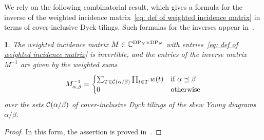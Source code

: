 \documentclass[oneside,english]{amsart}
\numberwithin{equation}{section}
\numberwithin{figure}{section}
\theoremstyle{plain}
\theoremstyle{plain}
\theoremstyle{plain}
\theoremstyle{remark}
\theoremstyle{plain}
\newtheorem{prop}[lem]{\protect\propositionname}
\theoremstyle{plain}
\theoremstyle{plain}
\theoremstyle{plain}
\theoremstyle{plain}
\theoremstyle{plain}
\theoremstyle{plain}
\theoremstyle{plain}
\providecommand{\propositionname}{Proposition}
\begin{document}
We rely on the following combinatorial result, which
gives a formula for the inverse of the weighted incidence 
matrix~\eqref{eq: def of weighted incidence matrix} in terms of cover-inclusive Dyck tilings.
Such formulas for the inverses appear
in~\cite{KW-double_dimer_pairings_and_skew_Young_diagrams,
SZ-path_representations_of_maximal_paraboloc_KL_polynomials, KKP-boundary_correlations_in_planar_LERW_and_UST}.
\begin{prop}
\label{prop: weighted KW incidence matrix inversion}
The weighted incidence matrix $M \in \mathbb{C}^{\mathrm{DP}_N \times \mathrm{DP}_N}$ with entries~\eqref{eq: def of weighted incidence matrix}
is invertible, and the entries of the inverse matrix $M^{-1}$ are given by the weighted sums %
\begin{align*} %
M^{-1}_{\alpha, \beta} = \begin{cases}
\sum_{T \in \CItilingsof (\alpha/\beta)} \prod_{t \in T} w(t) & \text{if }\alpha \DPleq \beta \\
0 & \text{otherwise} %
\end{cases}
\end{align*}
over the sets 
$\mathcal{C} (\alpha/\beta)$ %
of cover-inclusive Dyck tilings of the skew Young diagrams $\alpha/\beta$.
\end{prop}
\begin{proof}
In this form, the assertion is proved in~\cite[Theorem~2.9]{KKP-boundary_correlations_in_planar_LERW_and_UST}.
\end{proof}
\end{document}

